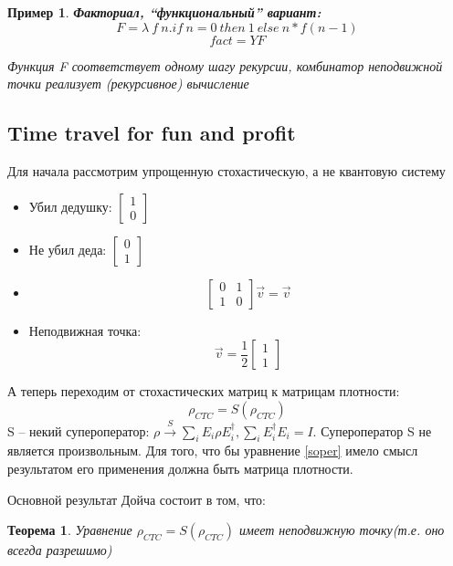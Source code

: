 \documentclass[a0,portrait]{a0poster}
\newtheorem{theor}{Теорема}[section]
\newtheorem{example}{Пример}[section]
\begin{document}
\begin{multicols}{2}
\begin{example} \textbf{Факториал, ``функциональный'' вариант:}
\[
 F = \lambda\ f\ n. if\ n=0\ then\ 1\ else\ n * f(n-1)
\]
\[
 fact = Y F
\]

Функция F соответствует одному шагу рекурсии, комбинатор неподвижной точки реализует (рекурсивное) вычисление
\end{example}

\subsection{Time travel for fun and profit}

Для начала рассмотрим упрощенную стохастическую, а не квантовую систему
\begin{itemize}
 \item  Убил дедушку: $\begin{bmatrix}
1 \\
0 
\end{bmatrix}$
\item Не убил деда: $\begin{bmatrix}
0 \\
1 
\end{bmatrix}$
\item 
\[
\begin{bmatrix}
0 & 1\\
1 & 0
\end{bmatrix}  \vec{v} = \vec{v} 
\]

\item Неподвижная точка: 
\[
 \vec{v}= \frac{1}{2}\begin{bmatrix}
1 \\
1 
\end{bmatrix}
\]

\end{itemize}
А теперь переходим от стохастических матриц к матрицам плотности:
\begin{equation}
\label{soper}
\rho_{CTC} =S(\rho_{CTC} )
\end{equation} 
S -- некий супероператор: $\rho \xrightarrow{S} \sum_i E_i \rho E_i^\dag, \sum_i E_i^\dag E_i = I$. Супероператор S не является произвольным. Для того, что бы уравнение \ref{soper} имело смысл результатом его применения должна быть матрица плотности.


Основной результат Дойча состоит в том, что:
\begin{theor}
  Уравнение $\rho_{CTC} =S(\rho_{CTC} )$ имеет неподвижную точку(т.е. оно всегда разрешимо)
\end{theor}


\end{multicols}
\end{document}
